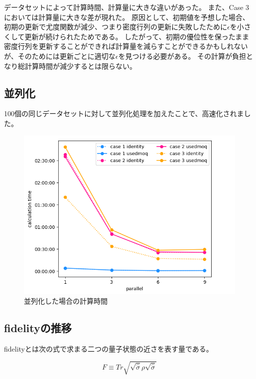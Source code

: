 \documentclass[11pt,a4j,notitlepage]{jreport}
\begin{document}
	データセットによって計算時間、計算量に大きな違いがあった。
	また、Case 3においては計算量に大きな差が現れた。
	原因として、初期値を予想した場合、初期の更新で尤度関数が減少、つまり密度行列の更新に失敗したために$\epsilon$を小さくして更新が続けられたためである。
	したがって、初期の優位性を保ったまま密度行列を更新することができれば計算量を減らすことができるかもしれないが、そのためには更新ごとに適切な$\epsilon$を見つける必要がある。
	その計算が負担となり総計算時間が減少するとは限らない。

	\newpage

	\subsection*{並列化}

	100個の同じデータセットに対して並列化処理を加えたことで、高速化されました。

	\begin{figure}[htbp]
		\centering
			\includegraphics[clip,width=12.0cm]{./picture/parallel.png}
			\caption{並列化した場合の計算時間}
	\end{figure}

	\newpage

	\subsection*{fidelityの推移}

	fidelityとは次の式で求まる二つの量子状態の近さを表す量である。

	\begin{equation}
		F \equiv Tr \sqrt{\sqrt{\hat{\sigma}} \rho \sqrt{\hat{\sigma}}}
	\end{equation}
\end{document}
